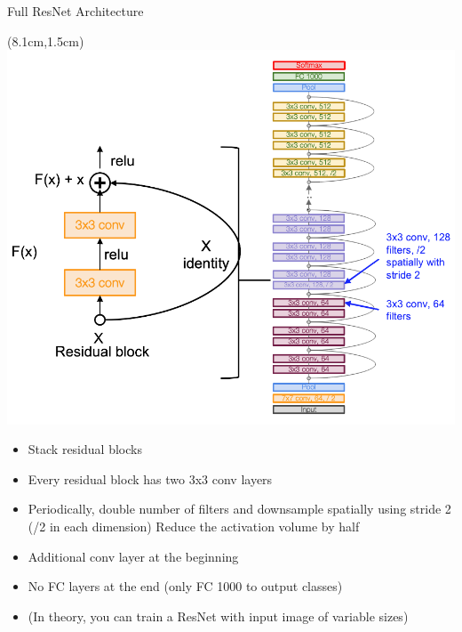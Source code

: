 \documentclass[serif, aspectratio=169]{beamer}
\begin{document}
\begin{frame}{Full ResNet Architecture}
	\begin{textblock*}{5cm}(8.1cm,1.5cm) %
		\includegraphics[keepaspectratio, scale=0.24]{pic/res_arch}
	\end{textblock*}
	
	\begin{itemize}
		\item Stack residual blocks
		\item Every residual block has two 3x3 conv layers
		\item Periodically, double number of filters \newline and downsample spatially using \newline stride 2 (/2 in each dimension) Reduce \newline the activation volume by half
		\item Additional conv layer at the beginning
		\item No FC layers at the end (only FC 1000 \newline to output classes)
		\item (In theory, you can train a ResNet with \newline input image of variable sizes)
	\end{itemize}
\end{frame}
\end{document}
